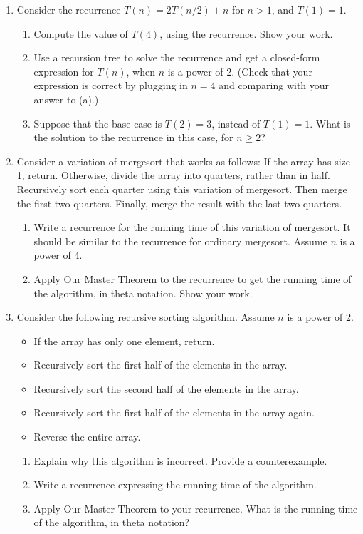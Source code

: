 \documentclass{article}
\begin{document}
\begin{enumerate}
    \item Consider the recurrence $T(n) = 2T(n/2) + n$ for $n > 1$, and $T(1) = 1$.
    \begin{enumerate}
        \item Compute the value of $T(4)$, using the recurrence. Show your work.
        \item Use a recursion tree to solve the recurrence and get a closed-form expression for $T(n)$, when $n$ is a power of 2. (Check that your expression is correct by plugging in $n = 4$ and comparing with your answer to (a).)
        \item Suppose that the base case is $T(2) = 3$, instead of $T(1) = 1$. What is the solution to the recurrence in this case, for $n \ge 2$?
    \end{enumerate}

    \item Consider a variation of mergesort that works as follows: If the array has size 1, return. Otherwise, divide the array into quarters, rather than in half. Recursively sort each quarter using this variation of mergesort. Then merge the first two quarters. Finally, merge the result with the last two quarters.
    \begin{enumerate}
        \item Write a recurrence for the running time of this variation of mergesort. It should be similar to the recurrence for ordinary mergesort. Assume $n$ is a power of 4.
        \item Apply Our Master Theorem to the recurrence to get the running time of the algorithm, in theta notation. Show your work.
    \end{enumerate}

    \item Consider the following recursive sorting algorithm. Assume $n$ is a power of 2.
    \begin{itemize}
        \item If the array has only one element, return.
        \item Recursively sort the first half of the elements in the array.
        \item Recursively sort the second half of the elements in the array.
        \item Recursively sort the first half of the elements in the array again.
        \item Reverse the entire array.
    \end{itemize}
    \begin{enumerate}
        \item  Explain why this algorithm is incorrect. Provide a counterexample.
        \item Write a recurrence expressing the running time of the algorithm.
        \item Apply Our Master Theorem to your recurrence. What is the running time of the algorithm, in theta notation?
    \end{enumerate}


\end{enumerate}
\end{document}
